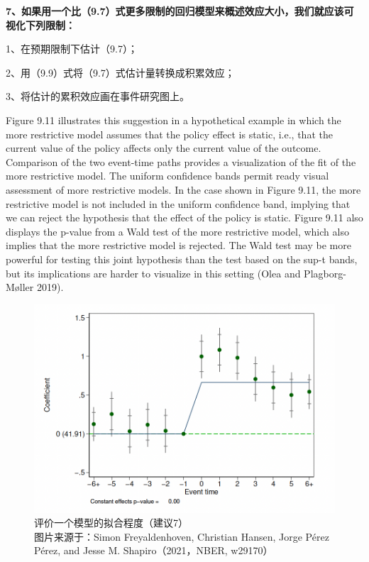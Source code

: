 \documentclass[cn,12pt,math=newtx,citestyle=gb7714-2015,bibstyle=gb7714-2015]{elegantbook}
\begin{document}
			\textbf{7、如果用一个比（9.7）式更多限制的回归模型来概述效应大小，我们就应该可视化下列限制：}

            1、在预期限制下估计（9.7）；
            
            2、用（9.9）式将（9.7）式估计量转换成积累效应；
            
            3、将估计的累积效应画在事件研究图上。

Figure 9.11 illustrates this suggestion in a hypothetical example in which the more restrictive model assumes that the policy effect is static, i.e., that the current value of the policy affects only the current value of the outcome. Comparison of the two event-time paths provides a visualization of the fit of the more restrictive model. The uniform confidence bands permit ready visual assessment of more restrictive models. In the case shown in Figure 9.11, the more restrictive model is not included in the uniform confidence band, implying that we can reject the hypothesis that the effect of the
policy is static. Figure 9.11 also displays the p-value from a Wald test of the more restrictive model, which also implies that the more restrictive model is rejected. The Wald test may be more powerful for testing this joint hypothesis than the test based on the sup-t bands, but its implications are harder to visualize in this setting (Olea and Plagborg-Møller 2019).



\begin{figure}[tbph]
	\centering
	\includegraphics[width=1\linewidth]{sug7}
	\caption{评价一个模型的拟合程度（建议7）\\ 图片来源于：Simon Freyaldenhoven, Christian Hansen, Jorge Pérez Pérez, and Jesse M. Shapiro（2021，NBER, w29170）}
	\label{fig:sug7}
\end{figure}
	
\end{document}
